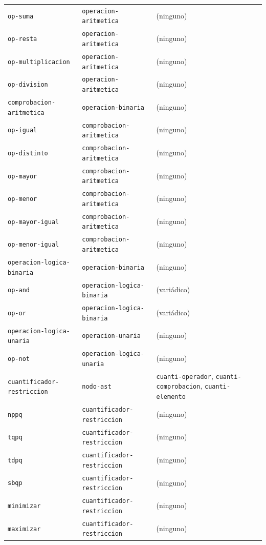 \documentclass[12pt,a4paper]{report}
\begin{document}
\begin{table}[h!]
\begin{tabular}{p{5cm} p{4cm} p{5.3cm}}
\texttt{op-suma}             & \texttt{operacion-aritmetica} & (ninguno) \\
\texttt{op-resta}            & \texttt{operacion-aritmetica} & (ninguno) \\
\texttt{op-multiplicacion}   & \texttt{operacion-aritmetica} & (ninguno) \\
\texttt{op-division}         & \texttt{operacion-aritmetica} & (ninguno) \\
\hline
\texttt{comprobacion-aritmetica}  & \texttt{operacion-binaria} & (ninguno) \\
\texttt{op-igual}            & \texttt{comprobacion-aritmetica} & (ninguno) \\
\texttt{op-distinto}         & \texttt{comprobacion-aritmetica} & (ninguno) \\
\texttt{op-mayor}            & \texttt{comprobacion-aritmetica} & (ninguno) \\
\texttt{op-menor}            & \texttt{comprobacion-aritmetica} & (ninguno) \\
\texttt{op-mayor-igual}      & \texttt{comprobacion-aritmetica} & (ninguno) \\
\texttt{op-menor-igual}      & \texttt{comprobacion-aritmetica} & (ninguno) \\
\hline
\texttt{operacion-logica-binaria} & \texttt{operacion-binaria} & (ninguno) \\
\texttt{op-and}              & \texttt{operacion-logica-binaria} & (variádico) \\
\texttt{op-or}               & \texttt{operacion-logica-binaria} & (variádico) \\
\hline
\texttt{operacion-logica-unaria}  & \texttt{operacion-unaria}  & (ninguno) \\
\texttt{op-not}              & \texttt{operacion-logica-unaria} & (ninguno) \\
\hline
\texttt{cuantificador-restriccion} & \texttt{nodo-ast}
  & \texttt{cuanti-operador}, \texttt{cuanti-comprobacion}, \texttt{cuanti-elemento} \\
\texttt{nppq}                & \texttt{cuantificador-restriccion} & (ninguno) \\
\texttt{tqpq}                & \texttt{cuantificador-restriccion} & (ninguno) \\
\texttt{tdpq}                & \texttt{cuantificador-restriccion} & (ninguno) \\
\texttt{sbqp}                & \texttt{cuantificador-restriccion} & (ninguno) \\
\texttt{minimizar}           & \texttt{cuantificador-restriccion} & (ninguno) \\
\texttt{maximizar}           & \texttt{cuantificador-restriccion} & (ninguno) \\
\hline
\end{tabular}
\end{table}
\end{document}

